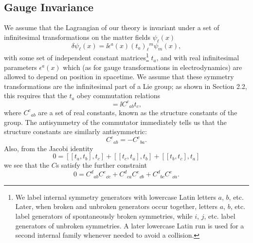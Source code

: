 
\subsection{Gauge Invariance}
\label{sec:15.1}

We assume that the Lagrangian of our theory is invariant under a set of
infinitesimal transformations on the matter fields $\psi_\ell(x)$
\begin{equation}
 \delta\psi_\ell(x)=\ii\epsilon^a(x)(t_a)_\ell{}^m\psi_m(x) ,
 \tag{15.1.1}\label{eq:15.1.1}
\end{equation}
with some set of independent constant matrices\footnote{We label internal
symmetry generators with lowercase Latin letters $a$, $b$, etc.  Later, when
broken and unbroken generators occur together, letters $a$, $b$, etc. label
generators of spontaneously broken symmetries, while $i$, $j$, etc. label
generators of unbroken symmetries. A later lowercase Latin run is used for a
second internal family whenever needed to avoid a collision.}
$t_a$, and with real infinitesimal parameters $\epsilon^a(x)$ which (as
for gauge transformations in electrodynamics) are allowed to depend on position
in spacetime. We assume that these symmetry transformations are the infinitesimal
part of a Lie group; as shown in Section 2.2, this requires that the $t_a$
obey commutation relations
\begin{equation}
 [t_a,t_b]=\ii C^c{}_{ab}t_c ,
 \tag{15.1.2}\label{eq:15.1.2}
\end{equation}
where $C^c{}_{ab}$ are a set of real constants, known as the
structure constants of the group. The antisymmetry of the commutator immediately
tells us that the structure constants are similarly antisymmetric:
\begin{equation}
 C^c{}_{ab}=-C^c{}_{ba} .
 \tag{15.1.3}\label{eq:15.1.3}
\end{equation}
Also, from the Jacobi identity
\begin{equation}
 0=[[t_a,t_b],t_c]+[[t_c,t_a],t_b]
   +[[t_b,t_c],t_a]
 \tag{15.1.4}\label{eq:15.1.4}
\end{equation}
we see that the $C$s satisfy the further constraint
\begin{equation}
 0=C^d{}_{ab}C^e{}_{\dd c}
  +C^d{}_{ca}C^e{}_{\dd b}
  +C^d{}_{bc}C^e{}_{\dd a} .
 \tag{15.1.5}\label{eq:15.1.5}
\end{equation}
